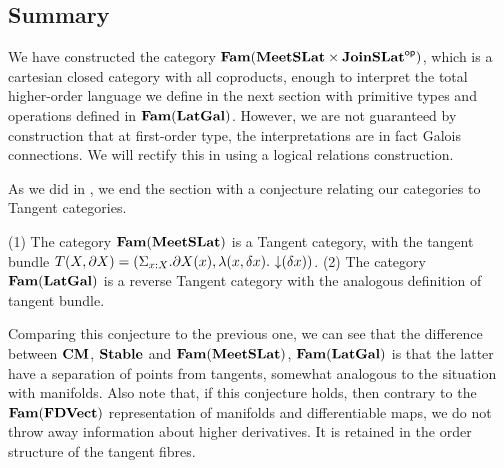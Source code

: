 \subsection{Summary}

We have constructed the category
$\mathbf{Fam}(\mathbf{MeetSLat} \times \mathbf{JoinSLat}^{\mathsf{op}})$, which is a cartesian closed
category with all coproducts, enough to interpret the total
higher-order language we define in the next section with primitive
types and operations defined in $\mathbf{Fam}(\mathbf{LatGal})$. However, we are not
guaranteed by construction that at first-order type, the
interpretations are in fact Galois connections. We will rectify this
in  using a logical relations construction.

As we did in , we end the section with a
conjecture relating our categories to Tangent categories.

\begin{conjecture}
  (1) The category $\mathbf{Fam}(\mathbf{MeetSLat})$ is a Tangent category, with the
  tangent bundle
  $T(X, \partial X) = (\Sigma_{x : X}. \partial X(x), \lambda (x,
  \delta x).\, \mathop{\downarrow}(\delta x))$. (2) The category $\mathbf{Fam}(\mathbf{LatGal})$
  is a reverse Tangent category with the analogous definition of
  tangent bundle.
\end{conjecture}

Comparing this conjecture to the previous one, we can see that the
difference between $\mathbf{CM}$, $\mathbf{Stable}$ and $\mathbf{Fam}(\mathbf{MeetSLat})$,
$\mathbf{Fam}(\mathbf{LatGal})$ is that the latter have a separation of points from
tangents, somewhat analogous to the situation with manifolds. Also
note that, if this conjecture holds, then contrary to the $\mathbf{Fam}(\mathbf{FDVect})$ representation of
manifolds and differentiable maps, we do
not throw away information about higher derivatives. It is retained in
the order structure of the tangent fibres.
